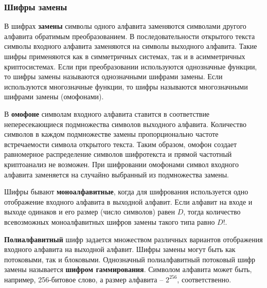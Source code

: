 ﻿\subsubsection{Шифры замены}

В шифрах \textbf{замены} символы одного алфавита заменяются символами другого алфавита обратимым преобразованием. В последовательности открытого текста символы входного алфавита заменяются на символы выходного алфавита. Такие шифры применяются как в симметричных системах, так и в асимметричных криптосистемах. Если при преобразовании используются однозначные функции, то шифры замены называются однозначными шифрами замены. Если используются многозначные функции, то шифры называются многозначными шифрами замены (омофонами).

В \textbf{омофоне} символам входного алфавита ставится в соответствие непересекающиеся  подмножества символов выходного алфавита. Количество символов в каждом подмножестве замены пропорционально частоте встречаемости символа открытого текста. Таким образом, омофон создает равномерное распределение символов шифротекста и прямой частотный криптоанализ не возможен. При шифровании омофонами символ входного алфавита заменяется на случайно выбранный из подмножества замены.

Шифры бывают \textbf{моноалфавитные}, когда для шифрования используется одно отображение входного алфавита в выходной алфавит. Если алфавит на входе и выходе одинаков и его размер (число символов) равен $D$, тогда количество всевозможных моноалфавитных шифров замены такого типа равно $D!$.

\textbf{Полиалфавитный} шифр задается множеством различных вариантов отображения входного алфавита на выходной алфавит. Шифры замены могут быть как потоковыми, так и блоковыми. Однозначный полиалфавитный потоковый шифр замены называется \textbf{шифром гаммирования}. Символом алфавита может быть, например, 256-битовое слово, а размер алфавита -- $2^{256}$, соответственно.
